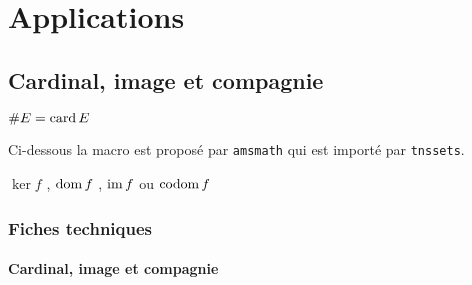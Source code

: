 \documentclass[12pt,a4paper]{article}
\begin{document}
\section{Applications}

\subsection{Cardinal, image et compagnie}


\begin{latexex}
$\card* E = \card E$
\end{latexex}





Ci-dessous la macro est proposé par \verb+amsmath+ qui est importé par \verb+tnssets+.

\begin{latexex}
$\ker f$ , $\operatorname{\operatorname{dom}} f$ ,
$\operatorname{\operatorname{im}} f$ ou $\operatorname{\operatorname{codom}} f$
\end{latexex}




\subsubsection{Fiches techniques}

\paragraph{Cardinal, image et compagnie}




\separation




\end{document}

